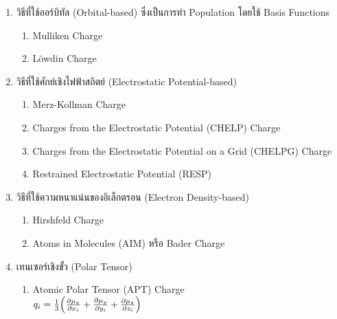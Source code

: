 \begin{enumerate}
    \item วิธีที่ใช้ออร์บิทัล (Orbital-based) ซึ่งเป็นการทำ Population โดยใช้ Basis Functions
        \begin{enumerate}
            \item Mulliken Charge\autocite{szabo1996}
            
            \item L\"{o}wdin Charge\autocite{lowdin1950}
        \end{enumerate}
    
    \item วิธีที่ใช้ศักย์เชิงไฟฟ้าสถิตย์ (Electrostatic Potential-based)
        \begin{enumerate}
            \item Merz-Kollman Charge\autocite{singh1984}
            
            \item Charges from the Electrostatic Potential (CHELP) Charge\autocite{chirlian1987}
            
            \item Charges from the Electrostatic Potential on a Grid (CHELPG) Charge\autocite{breneman1990}
            
            \item Restrained Electrostatic Potential (RESP)\autocite{cornell1993}
        \end{enumerate}
    
    \item วิธีที่ใช้ความหนาแน่นของอิเล็กตรอน (Electron Density-based)
    \begin{enumerate}
        \item Hirshfeld Charge\autocite{hirshfeld1977}
        
        \item Atoms in Molecules (AIM) หรือ Bader Charge\autocite{bader1985,bader1991}
    \end{enumerate}
    
    \item เทนเซอร์เชิงขั้ว (Polar Tensor)\autocite{person1974,milani2010}
        \begin{enumerate}
        \item Atomic Polar Tensor (APT) Charge \\
        $q_{i} = \frac{1}{3}\Big(\pdv{\mu_{x}}{x_{i}} + \pdv{\mu_{y}}{y_{i}} + \pdv{\mu_{z}}{z_{i}}\Big)$
        \end{enumerate}
\end{enumerate}

